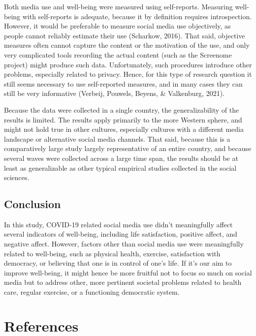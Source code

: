 \documentclass[
  man,mask]{apa6}
\begin{document}
Both media use and well-being were measured using self-reports.
Measuring well-being with self-reports is adequate, because it by definition requires introspection.
However, it would be preferable to measure social media use objectively, as people cannot reliably estimate their use (Scharkow, 2016).
That said, objective measures often cannot capture the content or the motivation of the use, and only very complicated tools recording the actual content (such as the Screenome project) might produce such data.
Unfortunately, such procedures introduce other problems, especially related to privacy.
Hence, for this type of research question it still seems necessary to use self-reported measures, and in many cases they can still be very informative (Verbeij, Pouwels, Beyens, \& Valkenburg, 2021).

Because the data were collected in a single country, the generalizability of the results is limited.
The results apply primarily to the more Western sphere, and might not hold true in other cultures, especially cultures with a different media landscape or alternative social media channels.
That said, because this is a comparatively large study largely representative of an entire country, and because several waves were collected across a large time span, the results should be at least as generalizable as other typical empirical studies collected in the social sciences.

\hypertarget{conclusion}{%
\subsection{Conclusion}\label{conclusion}}

In this study, COVID-19 related social media use didn't meaningfully affect several indicators of well-being, including life satisfaction, positive affect, and negative affect.
However, factors other than social media use were meaningfully related to well-being, such as physical health, exercise, satisfaction with democracy, or believing that one is in control of one's life.
If it's our aim to improve well-being, it might hence be more fruitful not to focus so much on social media but to address other, more pertinent societal problems related to health care, regular exercise, or a functioning democratic system.

\newpage

\hypertarget{references}{%
\section{References}\label{references}}
\end{document}
